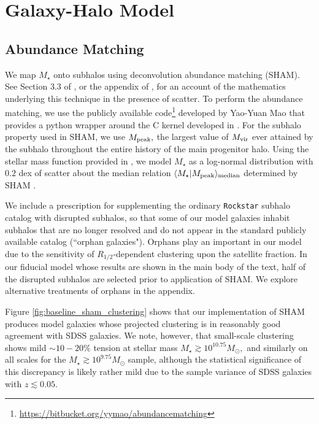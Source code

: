 \documentclass[usenatbib,usegraphicx,letterpaper]{mn2e}
\newcommand{\rhalf}{R_{1/2}}
\newcommand{\mstar}{M_{\star}}
\newcommand{\mvir}{M_{\rm vir}}
\newcommand{\mpeak}{M_{\rm peak}}
\newcommand{\median}[2]{\langle{#1}\vert{#2}\rangle_{\rm median}}
\newcommand{\msun}{M_\odot}
\begin{document}
\section{Galaxy-Halo Model}
\label{sec:model}

\subsection{Abundance Matching}
\label{subsec:sham}

We map $\mstar$ onto subhalos using deconvolution abundance matching (SHAM). See Section 3.3 of \citet{behroozi_etal10}, or the appendix of \citet{kravtsov_etal14}, for an account of the mathematics underlying this technique in the presence of scatter. To perform the abundance matching, we use the publicly available code\footnote{\url{https://bitbucket.org/yymao/abundancematching}} developed by Yao-Yuan Mao \citep{lehmann_etal15} that provides a python wrapper around the C kernel developed in \citet{behroozi_etal10}. For the subhalo property used in SHAM, we use $\mpeak,$ the largest value of $\mvir$ ever attained by the subhalo throughout the entire history of the main progenitor halo.  Using the stellar mass function provided in \citet{moustakas_etal13}, we model $\mstar$ as a log-normal distribution with $0.2$ dex of scatter about the median relation $\median{\mstar}{\mpeak}$ determined by SHAM \citep{reddick_etal13}.

We include a prescription for supplementing the ordinary {\tt Rockstar} subhalo catalog with disrupted subhalos, so that some of our model galaxies inhabit subhalos that are no longer resolved and do not appear in the standard publicly available catalog (``orphan galaxies"). Orphans play an important in our model due to the sensitivity of $\rhalf$-dependent clustering upon the satellite fraction. In our fiducial model whose results are shown in the main body of the text, half of the disrupted subhalos are selected prior to application of SHAM. We explore alternative treatments of orphans in the appendix.

Figure \ref{fig:baseline_sham_clustering} shows that our implementation of SHAM produces model galaxies whose projected clustering is in reasonably good agreement with SDSS galaxies. We note, however, that small-scale clustering shows mild $\sim10-20\%$ tension at stellar mass $\mstar\gtrsim10^{10.75}\msun,$ and similarly on all scales for the $\mstar\gtrsim10^{9.75}\msun$ sample, although the statistical significance of this discrepancy is likely rather mild due to the sample variance of SDSS galaxies with $z\lesssim0.05.$
\end{document}
